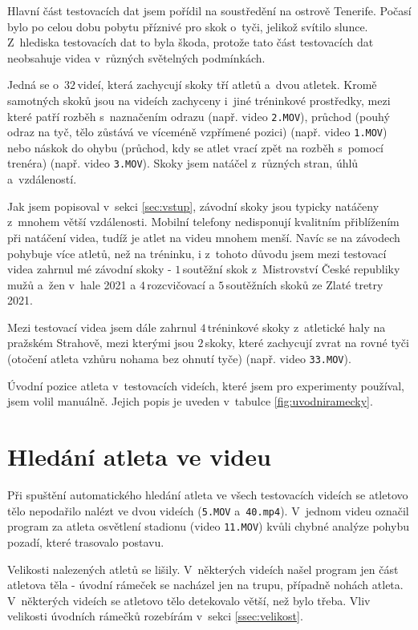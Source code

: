 Hlavní část testovacích dat jsem pořídil na soustředění na ostrově Tenerife. Počasí bylo po celou dobu pobytu příznivé pro skok o~tyči, jelikož svítilo slunce. Z~hlediska testovacích dat to byla škoda, protože tato část testovacích dat neobsahuje videa v~různých světelných podmínkách.

Jedná se o~$32$\,\rm videí, která zachycují skoky tří atletů a~dvou atletek. Kromě samotných skoků jsou na videích zachyceny i~jiné tréninkové prostředky, mezi které patří rozběh s~naznačením odrazu (např. video \texttt{2.MOV}), průchod (pouhý odraz na tyč, tělo zůstává ve víceméně vzpřímené pozici) (např. video \texttt{1.MOV}) nebo náskok do ohybu (průchod, kdy se atlet vrací zpět na rozběh s~pomocí trenéra) (např. video \texttt{3.MOV}). Skoky jsem natáčel z~různých stran, úhlů a~vzdáleností.

Jak jsem popisoval v~sekci \ref{sec:vstup}, závodní skoky jsou typicky natáčeny z~mnohem větší vzdálenosti. Mobilní telefony nedisponují kvalitním přiblížením při natáčení videa, tudíž je atlet na videu mnohem menší. Navíc se na závodech pohybuje více atletů, než na tréninku, i z~tohoto důvodu jsem mezi testovací videa zahrnul mé závodní skoky - $1$\,\rm soutěžní skok z~Mistrovství České republiky mužů a~žen v~hale 2021 a $4$\,\rm rozcvičovací a $5$\,\rm soutěžních skoků ze Zlaté tretry 2021.

Mezi testovací videa jsem dále zahrnul $4$\,\rm tréninkové skoky z~atletické haly na pražském Strahově, mezi kterými jsou $2$\,\rm skoky, které zachycují zvrat na rovné tyči (otočení atleta vzhůru nohama bez ohnutí tyče) (např. video \texttt{33.MOV}).

Úvodní pozice atleta v~testovacích videích, které jsem pro experimenty používal, jsem volil manuálně. Jejich popis je uveden v~tabulce \ref{fig:uvodniramecky}.



\section{Hledání atleta ve videu}

Při spuštění automatického hledání atleta ve všech testovacích videích se atletovo tělo nepodařilo nalézt ve dvou videích (\texttt{5.MOV} a~\texttt{40.mp4}). V~jednom videu označil program za atleta osvětlení stadionu (video \texttt{11.MOV}) kvůli chybné analýze pohybu pozadí, které trasovalo postavu.

Velikosti nalezených atletů se lišily. V~některých videích našel program jen část atletova těla - úvodní rámeček se nacházel jen na trupu, případně nohách atleta. V~některých videích se atletovo tělo detekovalo větší, než bylo třeba. Vliv velikosti úvodních rámečků rozebírám v~sekci \ref{ssec:velikost}.

